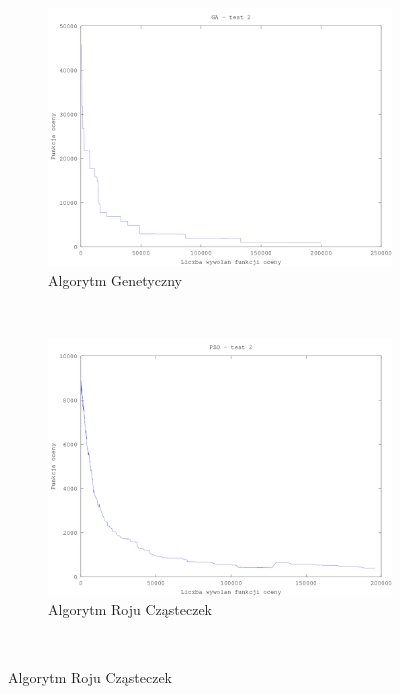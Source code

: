 \begin{figure}[H]
        \centering
\begin{subfigure}[b]{0.5\textwidth}
                \includegraphics[width=\textwidth]{ga_test_2.png}
                \caption{Algorytm Genetyczny}
        \end{subfigure}%
        ~ %
        \begin{subfigure}[b]{0.5\textwidth}
                \includegraphics[width=\textwidth]{pso_2.png}
                \caption{Algorytm Roju Cząsteczek}
        \end{subfigure}
        ~ %

\end{figure}
